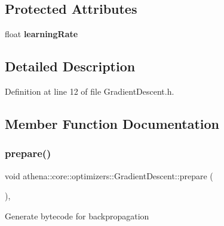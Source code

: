\subsection*{Protected Attributes}
\begin{DoxyCompactItemize}
\item 
\mbox{\label{classathena_1_1core_1_1optimizers_1_1_gradient_descent_a40fd65d38f6804e2e8c7109f7cd27e67}} 
float {\bfseries learning\+Rate}
\end{DoxyCompactItemize}


\subsection{Detailed Description}


Definition at line 12 of file Gradient\+Descent.\+h.



\subsection{Member Function Documentation}
\mbox{\label{classathena_1_1core_1_1optimizers_1_1_gradient_descent_ab9ecd3b02a82c86bfaaa3d93789d2d5a}} 
\subsubsection{\texorpdfstring{prepare()}{prepare()}}
{\footnotesize\ttfamily void athena\+::core\+::optimizers\+::\+Gradient\+Descent\+::prepare (\begin{DoxyParamCaption}{ }\end{DoxyParamCaption})\hspace{0.3cm}{\ttfamily [override]}, {\ttfamily [virtual]}}

Generate bytecode for backpropagation 

